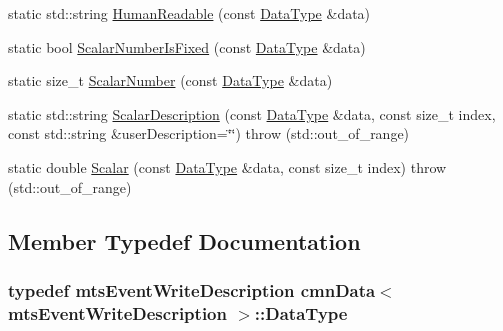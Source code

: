\begin{DoxyCompactItemize}
\item 
static std\-::string \hyperlink{classcmn_data_3_01mts_event_write_description_01_4_a9a5045186add9f9a0428247d17952763}{Human\-Readable} (const \hyperlink{classcmn_data_3_01mts_event_write_description_01_4_a0c398e4adf26c99124f9f6cd19fb70dc}{Data\-Type} \&data)
\item 
static bool \hyperlink{classcmn_data_3_01mts_event_write_description_01_4_ac35755b8deee1aa7fff1e106b1b3d5e9}{Scalar\-Number\-Is\-Fixed} (const \hyperlink{classcmn_data_3_01mts_event_write_description_01_4_a0c398e4adf26c99124f9f6cd19fb70dc}{Data\-Type} \&data)
\item 
static size\-\_\-t \hyperlink{classcmn_data_3_01mts_event_write_description_01_4_ad175d4f3dfc5a5591b50986f9a339646}{Scalar\-Number} (const \hyperlink{classcmn_data_3_01mts_event_write_description_01_4_a0c398e4adf26c99124f9f6cd19fb70dc}{Data\-Type} \&data)
\item 
static std\-::string \hyperlink{classcmn_data_3_01mts_event_write_description_01_4_ac4180d154c1762a844b4d0d9ea873340}{Scalar\-Description} (const \hyperlink{classcmn_data_3_01mts_event_write_description_01_4_a0c398e4adf26c99124f9f6cd19fb70dc}{Data\-Type} \&data, const size\-\_\-t index, const std\-::string \&user\-Description=\char`\"{}\char`\"{})  throw (std\-::out\-\_\-of\-\_\-range)
\item 
static double \hyperlink{classcmn_data_3_01mts_event_write_description_01_4_a933a9283178eb60fe5c3d29d7fdbbc33}{Scalar} (const \hyperlink{classcmn_data_3_01mts_event_write_description_01_4_a0c398e4adf26c99124f9f6cd19fb70dc}{Data\-Type} \&data, const size\-\_\-t index)  throw (std\-::out\-\_\-of\-\_\-range)
\end{DoxyCompactItemize}


\subsection{Member Typedef Documentation}
\hypertarget{classcmn_data_3_01mts_event_write_description_01_4_a0c398e4adf26c99124f9f6cd19fb70dc}{
\subsubsection[{Data\-Type}]{\setlength{\rightskip}{0pt plus 5cm}typedef {\bf mts\-Event\-Write\-Description} {\bf cmn\-Data}$<$ {\bf mts\-Event\-Write\-Description} $>$\-::{\bf Data\-Type}}}\label{classcmn_data_3_01mts_event_write_description_01_4_a0c398e4adf26c99124f9f6cd19fb70dc}


